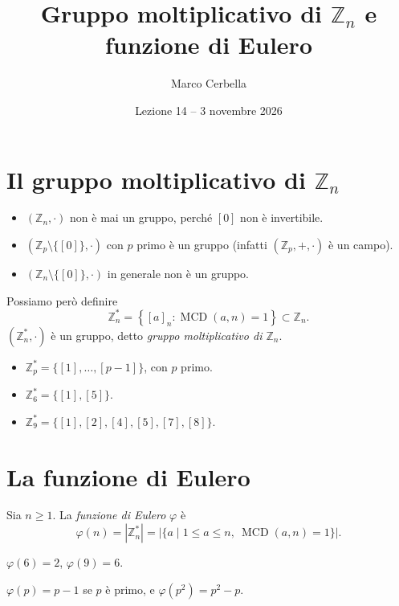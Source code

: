 \documentclass[11pt,a4paper]{article}
\title{Gruppo moltiplicativo di $\mathbb{Z}_n$ e funzione di Eulero}
\author{Marco Cerbella}
\date{Lezione 14 -- 3 novembre 2026}
\begin{document}
\maketitle

\section{Il gruppo moltiplicativo di $\mathbb{Z}_n$}

\begin{itemize}
  \item $(\mathbb{Z}_n, \cdot)$ non è mai un gruppo, perché $[0]$ non è invertibile.
  \item $(\mathbb{Z}_p\setminus\{[0]\}, \cdot)$ con $p$ primo è un gruppo (infatti $(\mathbb{Z}_p, +, \cdot)$ è un campo).
  \item $(\mathbb{Z}_n\setminus\{[0]\}, \cdot)$ in generale non è un gruppo.
\end{itemize}
Possiamo però definire
\[
  \mathbb{Z}_n^* = \left\{ [a]_n : \operatorname{MCD}(a, n) = 1 \right\} \subset \mathbb{Z}_n .
\]
$(\mathbb{Z}_n^*, \cdot)$ è un gruppo, detto \emph{gruppo moltiplicativo di $\mathbb{Z}_n$}.

\begin{esempio}
\begin{itemize}
  \item $\mathbb{Z}_p^* = \{[1], \dots, [p-1]\}$, con $p$ primo.
  \item $\mathbb{Z}_6^* = \{[1], [5]\}$.
  \item $\mathbb{Z}_9^* = \{[1], [2], [4], [5], [7], [8]\}$.
\end{itemize}
\end{esempio}

\section{La funzione di Eulero}

\begin{definizione}
Sia $n \ge 1$. La \emph{funzione di Eulero} $\varphi$ è
\[
  \varphi(n) = |\mathbb{Z}_n^*| = \Big|\big\{ a \mid 1 \le a \le n,\ \operatorname{MCD}(a, n) = 1 \big\}\Big| .
\]
\end{definizione}

\begin{esempio}
$\varphi(6) = 2$, \qquad $\varphi(9) = 6$.
\end{esempio}

\begin{osservazione}
$\varphi(p) = p - 1$ se $p$ è primo, e $\varphi(p^2) = p^2 - p$.
\end{osservazione}
\end{document}
